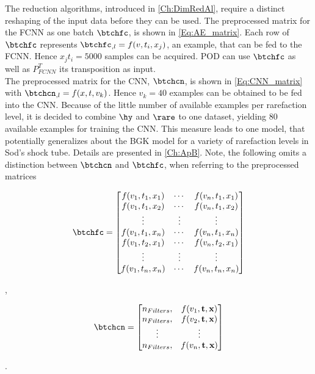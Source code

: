 The reduction algorithms, introduced in \cref{Ch:DimRedAl}, require a distinct reshaping of the input data before they can be used. The preprocessed matrix for the FCNN as one batch  \(\btchfc\), is shown in \cref{Eq:AE_matrix}. Each row of \(\btchfc\) represents \(\btchfc_{,l}=f(v,t_i,x_j)\), an example, that can be fed to the FCNN. Hence \(x_jt_i=5000\) samples can be acquired. POD can use \(\btchfc\) as well as \(P^T_{FCNN}\) its transposition as input.\\
The preprocessed matrix for the CNN, \(\btchcn\), is shown in \cref{Eq:CNN_matrix} with \(\btchcn_{,l} = f(x,t,v_k)\). Hence \(v_k=40\) examples can be obtained to be fed into the CNN. Because of the little number of available examples per rarefaction level, it is decided to combine \(\hy\) and \(\rare\) to one dataset, yielding 80 available examples for training the CNN. This measure leads to one model, that potentially generalizes about the BGK model for a variety of rarefaction levels in Sod's shock tube. Details are presented in \cref{Ch:ApB}. Note, the following omits a distinction between \(\btchcn\) and \(\btchfc\), when referring to the preprocessed matrices\\
\begin{minipage}{.45\linewidth}
	\begin{gather}
	\btchfc = \begin{bmatrix}
	f(v_1,t_1,x_1)&\cdots &f(v_n,t_1,x_1) \\
	f(v_1,t_1,x_2)&\cdots &f(v_n,t_1,x_2) \\
	\vdots& \vdots & \vdots\\
	f(v_1,t_1,x_n)&\cdots &f(v_n,t_1,x_n)\\
	f(v_1,t_2,x_1)&\cdots &f(v_n,t_2,x_1)\\
	\vdots & \vdots & \vdots\\
	f(v_1,t_n,x_n)&\cdots &f(v_n,t_n,x_n)
	\end{bmatrix}
	\label{Eq:AE_matrix}
	\end{gather}
\end{minipage},\qquad%
\begin{minipage}{.35\linewidth}
	\begin{gather}
	\btchcn= \begin{bmatrix}
	n_{Filters},&f(v_1,\textbf{t},\textbf{x})\\
	n_{Filters},&f(v_2,\textbf{t},\textbf{x})\\
	\vdots&\vdots\\
	n_{Filters},&f(v_n,\textbf{t},\textbf{x})
	\end{bmatrix}
	\label{Eq:CNN_matrix}
	\end{gather}
\end{minipage}\textrm{.}\\\\

